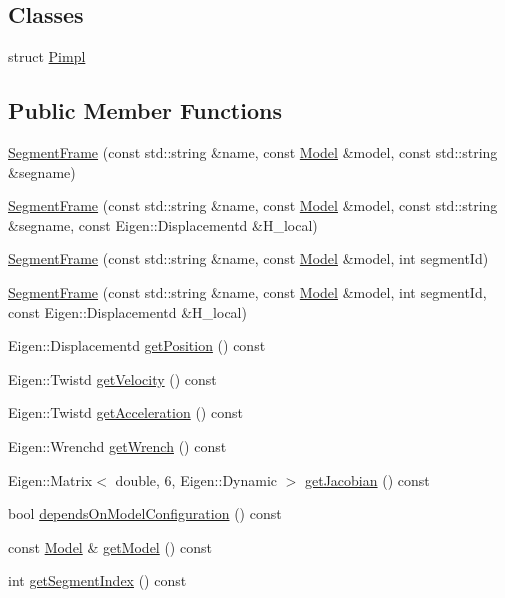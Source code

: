 \subsection*{Classes}
\begin{DoxyCompactItemize}
\item 
struct \hyperlink{structocra_1_1SegmentFrame_1_1Pimpl}{Pimpl}
\end{DoxyCompactItemize}
\subsection*{Public Member Functions}
\begin{DoxyCompactItemize}
\item 
\hyperlink{classocra_1_1SegmentFrame_ab05987e2ecc0f904c905b9e66269ce84}{Segment\+Frame} (const std\+::string \&name, const \hyperlink{classocra_1_1Model}{Model} \&model, const std\+::string \&segname)
\item 
\hyperlink{classocra_1_1SegmentFrame_ad9cd47c330239c77e913d38029af808d}{Segment\+Frame} (const std\+::string \&name, const \hyperlink{classocra_1_1Model}{Model} \&model, const std\+::string \&segname, const Eigen\+::\+Displacementd \&H\+\_\+local)
\item 
\hyperlink{classocra_1_1SegmentFrame_a01156da94eca5bf4961077a3310fc271}{Segment\+Frame} (const std\+::string \&name, const \hyperlink{classocra_1_1Model}{Model} \&model, int segment\+Id)
\item 
\hyperlink{classocra_1_1SegmentFrame_a3864bc8263c40f7afa11de3c8c2dd76b}{Segment\+Frame} (const std\+::string \&name, const \hyperlink{classocra_1_1Model}{Model} \&model, int segment\+Id, const Eigen\+::\+Displacementd \&H\+\_\+local)
\item 
Eigen\+::\+Displacementd \hyperlink{classocra_1_1SegmentFrame_af4b9d36490294e99b8082e4c33220996}{get\+Position} () const 
\item 
Eigen\+::\+Twistd \hyperlink{classocra_1_1SegmentFrame_af925381d3b6b83eb7b4eff237ee08f09}{get\+Velocity} () const 
\item 
Eigen\+::\+Twistd \hyperlink{classocra_1_1SegmentFrame_a407001257d0abd972d29e32cef274925}{get\+Acceleration} () const 
\item 
Eigen\+::\+Wrenchd \hyperlink{classocra_1_1SegmentFrame_a8e8f514feb326352542a770e15d9d7e9}{get\+Wrench} () const 
\item 
Eigen\+::\+Matrix$<$ double, 6, Eigen\+::\+Dynamic $>$ \hyperlink{classocra_1_1SegmentFrame_a13f905cdf093a061021eddadb5335d7f}{get\+Jacobian} () const 
\item 
bool \hyperlink{classocra_1_1SegmentFrame_a7f71699ca27169efbf2e6172d7d58f63}{depends\+On\+Model\+Configuration} () const 
\item 
const \hyperlink{classocra_1_1Model}{Model} \& \hyperlink{classocra_1_1SegmentFrame_a1913ac15c02d2a9d0b1cf6e9a5827b1d}{get\+Model} () const 
\item 
int \hyperlink{classocra_1_1SegmentFrame_af36f5942b1aba54d7465eed5ec09403c}{get\+Segment\+Index} () const 
\end{DoxyCompactItemize}
